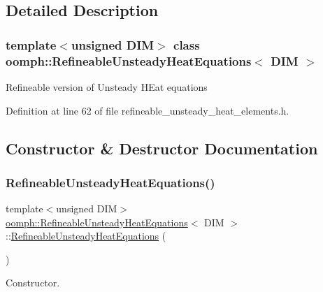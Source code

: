 \subsection{Detailed Description}
\subsubsection*{template$<$unsigned D\+IM$>$\newline
class oomph\+::\+Refineable\+Unsteady\+Heat\+Equations$<$ D\+I\+M $>$}

Refineable version of Unsteady H\+Eat equations 

Definition at line 62 of file refineable\+\_\+unsteady\+\_\+heat\+\_\+elements.\+h.



\subsection{Constructor \& Destructor Documentation}
\mbox{\label{classoomph_1_1RefineableUnsteadyHeatEquations_a288d73b971d6c891ef0061e4f0af1efd}} 
\subsubsection{\texorpdfstring{Refineable\+Unsteady\+Heat\+Equations()}{RefineableUnsteadyHeatEquations()}\hspace{0.1cm}{\footnotesize\ttfamily [1/2]}}
{\footnotesize\ttfamily template$<$unsigned D\+IM$>$ \\
\hyperlink{classoomph_1_1RefineableUnsteadyHeatEquations}{oomph\+::\+Refineable\+Unsteady\+Heat\+Equations}$<$ D\+IM $>$\+::\hyperlink{classoomph_1_1RefineableUnsteadyHeatEquations}{Refineable\+Unsteady\+Heat\+Equations} (\begin{DoxyParamCaption}{ }\end{DoxyParamCaption})\hspace{0.3cm}{\ttfamily [inline]}}



Constructor. 



